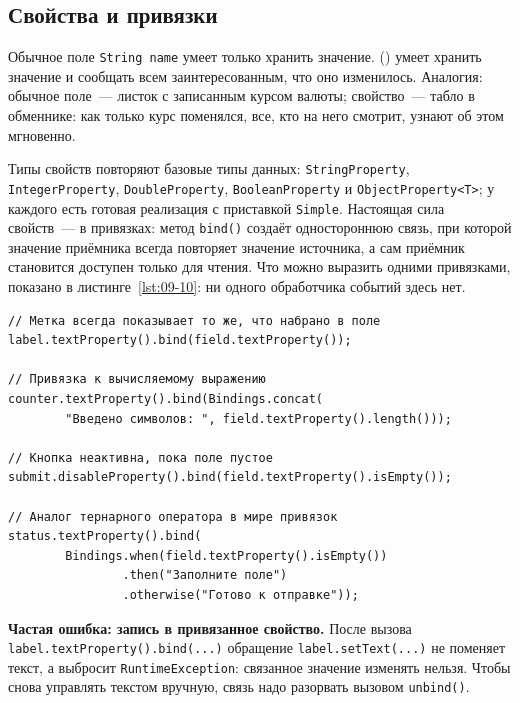 \subsection{Свойства и привязки}

Обычное поле \texttt{String name} умеет только хранить значение.
 () умеет хранить значение и сообщать всем
заинтересованным, что оно изменилось. Аналогия: обычное поле~--- листок с
записанным курсом валюты; свойство~--- табло в обменнике: как только курс
поменялся, все, кто на него смотрит, узнают об этом мгновенно.

Типы свойств повторяют базовые типы данных: \texttt{StringProperty},
\texttt{IntegerProperty}, \texttt{DoubleProperty}, \texttt{BooleanProperty} и
\texttt{ObjectProperty<T>}; у каждого есть готовая реализация с приставкой
\texttt{Simple}. Настоящая сила свойств~--- в
привязках: метод \texttt{bind()} создаёт одностороннюю связь, при которой
значение приёмника всегда повторяет значение источника, а сам приёмник
становится доступен только для чтения. Что можно выразить одними привязками,
показано в листинге~\ref{lst:09-10}: ни одного обработчика событий здесь нет.

\begin{listing}[H]
\begin{verbatim}
// Метка всегда показывает то же, что набрано в поле
label.textProperty().bind(field.textProperty());

// Привязка к вычисляемому выражению
counter.textProperty().bind(Bindings.concat(
        "Введено символов: ", field.textProperty().length()));

// Кнопка неактивна, пока поле пустое
submit.disableProperty().bind(field.textProperty().isEmpty());

// Аналог тернарного оператора в мире привязок
status.textProperty().bind(
        Bindings.when(field.textProperty().isEmpty())
                .then("Заполните поле")
                .otherwise("Готово к отправке"));
\end{verbatim}
\caption{Односторонние привязки}
\label{lst:09-10}
\end{listing}

\begin{oshibka}
\textbf{Частая ошибка: запись в привязанное свойство.} После вызова
\texttt{label.textProperty().bind(...)} обращение \texttt{label.setText(...)} не
поменяет текст, а выбросит \texttt{RuntimeException}: связанное значение
изменять нельзя. Чтобы снова управлять текстом вручную, связь надо разорвать
вызовом \texttt{unbind()}.
\end{oshibka}

